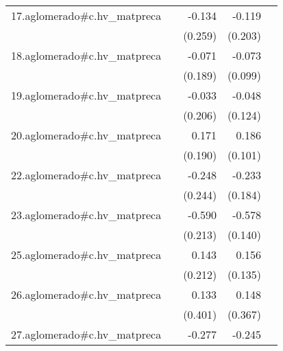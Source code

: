 {\begin{longtable}{l*{4}{D{.}{.}{-1}}}
\addlinespace
17.aglomerado#c.hv\_matpreca&                     &      -0.134         &      -0.119         &                     \\
            &                     &     (0.259)         &     (0.203)         &                     \\
\addlinespace
18.aglomerado#c.hv\_matpreca&                     &      -0.071         &      -0.073         &                     \\
            &                     &     (0.189)         &     (0.099)         &                     \\
\addlinespace
19.aglomerado#c.hv\_matpreca&                     &      -0.033         &      -0.048         &                     \\
            &                     &     (0.206)         &     (0.124)         &                     \\
\addlinespace
20.aglomerado#c.hv\_matpreca&                     &       0.171         &       0.186         &                     \\
            &                     &     (0.190)         &     (0.101)         &                     \\
\addlinespace
22.aglomerado#c.hv\_matpreca&                     &      -0.248         &      -0.233         &                     \\
            &                     &     (0.244)         &     (0.184)         &                     \\
\addlinespace
23.aglomerado#c.hv\_matpreca&                     &      -0.590\sym{**} &      -0.578\sym{***}&                     \\
            &                     &     (0.213)         &     (0.140)         &                     \\
\addlinespace
25.aglomerado#c.hv\_matpreca&                     &       0.143         &       0.156         &                     \\
            &                     &     (0.212)         &     (0.135)         &                     \\
\addlinespace
26.aglomerado#c.hv\_matpreca&                     &       0.133         &       0.148         &                     \\
            &                     &     (0.401)         &     (0.367)         &                     \\
\addlinespace
27.aglomerado#c.hv\_matpreca&                     &      -0.277         &      -0.245\sym{***}&                     \\

\end{longtable}}
